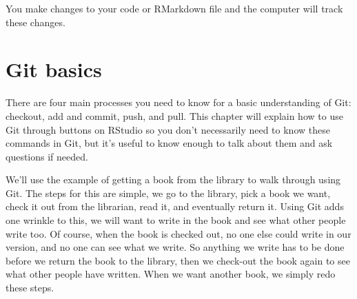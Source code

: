 \documentclass[
  12pt,
  openany]{book}
\begin{document}
You make changes to your code or RMarkdown file and the computer will track these changes.

\hypertarget{git-basics}{%
\section{Git basics}\label{git-basics}}

There are four main processes you need to know for a basic understanding of Git: checkout, add and commit, push, and pull. This chapter will explain how to use Git through buttons on RStudio so you don't necessarily need to know these commands in Git, but it's useful to know enough to talk about them and ask questions if needed.

We'll use the example of getting a book from the library to walk through using Git. The steps for this are simple, we go to the library, pick a book we want, check it out from the librarian, read it, and eventually return it. Using Git adds one wrinkle to this, we will want to write in the book and see what other people write too. Of course, when the book is checked out, no one else could write in our version, and no one can see what we write. So anything we write has to be done before we return the book to the library, then we check-out the book again to see what other people have written. When we want another book, we simply redo these steps.
\end{document}
